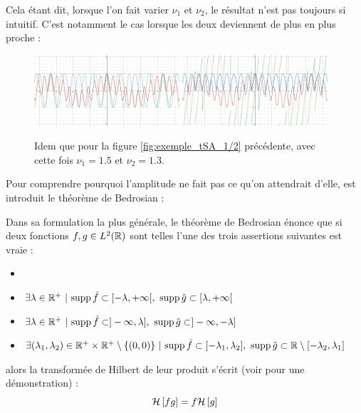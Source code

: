 Cela étant dit, lorsque l'on fait varier $\nu_1$ et $\nu_2$, le résultat n'est pas toujours si intuitif. C'est notamment le cas lorsque les deux deviennent de plus en plus proche :

\begin{figure}[h]\centering
	\includegraphics[width=0.48\textwidth]{fig/part-1/ex SA - 21.png}\hfill
	\includegraphics[width=0.48\textwidth]{fig/part-1/ex SA - 22.png}
	\caption{Idem que pour la figure \ref{fig:exemple_tSA_1/2} précédente, avec cette fois $\nu_1=1.5$ et $\nu_2=1.3$.}
	\label{fig:exemple_tSA_2/2}
\end{figure}

Pour comprendre pourquoi l'amplitude ne fait pas ce qu'on attendrait d'elle, est introduit le théorème de Bedrosian :

\begin{theoreme}[de Bedrosian]\label{theo:2Bedrosian}
	Dans sa formulation la plus générale, le théorème de Bedrosian énonce que si deux fonctions $f,g\in L^2(\mathbb{R})$ sont telles l'une des trois assertions suivantes est vraie :
	\begin{itemize}%
		\item 
		\item $\exists \lambda\in\mathbb{R}^+\ |\ \text{\normalfont supp}\, \hat{f} \subset [-\lambda, +\infty[,\ \text{\normalfont supp}\, \hat{g} \subset [\lambda, +\infty[$\label{item:1condi_theo2Bedrosian}
		
		\item $\exists \lambda\in\mathbb{R}^+\ |\ \text{\normalfont supp}\, \hat{f} \subset ]-\infty, \lambda],\ \text{\normalfont supp}\, \hat{g} \subset ]-\infty,-\lambda]$ \label{item:2condi_theo2Bedrosian}
		
		\item $\exists (\lambda_1,\lambda_2)\in \mathbb{R}^+\times\mathbb{R}^+ \setminus\{(0,0)\}\ |\ \text{\normalfont supp}\, \hat{f} \subset [-\lambda_1, \lambda_2],\ \text{\normalfont supp}\, \hat{g} \subset \mathbb{R}\setminus[-\lambda_2,\lambda_1]$
		
	\end{itemize}
	alors la transformée de Hilbert de leur produit s'écrit (voir \cite{wang_simple_2009} pour une démonstration) :
	\begin{equation}\label{eq:2Bedrosian}
		\mathcal{H}\left[fg\right] = f\mathcal{H}\left[g\right]
	\end{equation}
\end{theoreme}

